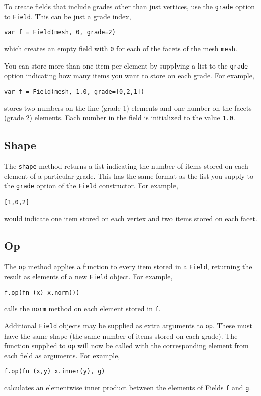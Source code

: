 To create fields that include grades other than just vertices, use the
\texttt{grade} option to \texttt{Field}. This can be just a grade index,

\begin{lstlisting}
var f = Field(mesh, 0, grade=2)
\end{lstlisting}

which creates an empty field with \texttt{0} for each of the facets of
the mesh \texttt{mesh}.

You can store more than one item per element by supplying a list to the
\texttt{grade} option indicating how many items you want to store on
each grade. For example,

\begin{lstlisting}
var f = Field(mesh, 1.0, grade=[0,2,1])
\end{lstlisting}

stores two numbers on the line (grade 1) elements and one number on the
facets (grade 2) elements. Each number in the field is initialized to
the value \texttt{1.0}.

\hypertarget{shape}{%
\subsection{Shape}\label{shape}}

The \texttt{shape} method returns a list indicating the number of items
stored on each element of a particular grade. This has the same format
as the list you supply to the \texttt{grade} option of the
\texttt{Field} constructor. For example,

\begin{lstlisting}
[1,0,2]
\end{lstlisting}

would indicate one item stored on each vertex and two items stored on
each facet.

\hypertarget{op}{%
\subsection{Op}\label{op}}

The \texttt{op} method applies a function to every item stored in a
\texttt{Field}, returning the result as elements of a new \texttt{Field}
object. For example,

\begin{lstlisting}
f.op(fn (x) x.norm())
\end{lstlisting}

calls the \texttt{norm} method on each element stored in \texttt{f}.

Additional \texttt{Field} objects may be supplied as extra arguments to
\texttt{op}. These must have the same shape (the same number of items
stored on each grade). The function supplied to \texttt{op} will now be
called with the corresponding element from each field as arguments. For
example,

\begin{lstlisting}
f.op(fn (x,y) x.inner(y), g)
\end{lstlisting}

calculates an elementwise inner product between the elements of Fields
\texttt{f} and \texttt{g}.
